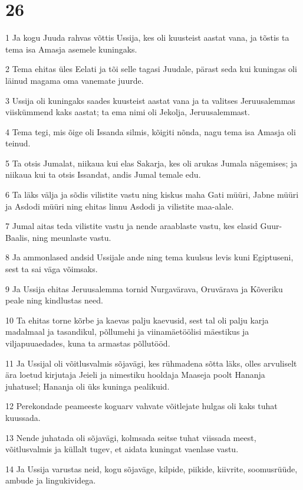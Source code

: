 \chapter{26}

\par 1 Ja kogu Juuda rahvas võttis Ussija, kes oli kuusteist aastat vana, ja tõstis ta tema isa Amasja asemele kuningaks.
\par 2 Tema ehitas üles Eelati ja tõi selle tagasi Juudale, pärast seda kui kuningas oli läinud magama oma vanemate juurde.
\par 3 Ussija oli kuningaks saades kuusteist aastat vana ja ta valitses Jeruusalemmas viiskümmend kaks aastat; ta ema nimi oli Jekolja, Jeruusalemmast.
\par 4 Tema tegi, mis õige oli Issanda silmis, kõigiti nõnda, nagu tema isa Amasja oli teinud.
\par 5 Ta otsis Jumalat, niikaua kui elas Sakarja, kes oli arukas Jumala nägemises; ja niikaua kui ta otsis Issandat, andis Jumal temale edu.
\par 6 Ta läks välja ja sõdis vilistite vastu ning kiskus maha Gati müüri, Jabne müüri ja Asdodi müüri ning ehitas linnu Asdodi ja vilistite maa-alale.
\par 7 Jumal aitas teda vilistite vastu ja nende araablaste vastu, kes elasid Guur-Baalis, ning meunlaste vastu.
\par 8 Ja ammonlased andsid Ussijale ande ning tema kuulsus levis kuni Egiptuseni, sest ta sai väga võimsaks.
\par 9 Ja Ussija ehitas Jeruusalemma tornid Nurgavärava, Oruvärava ja Kõveriku peale ning kindlustas need.
\par 10 Ta ehitas torne kõrbe ja kaevas palju kaevusid, sest tal oli palju karja madalmaal ja tasandikul, põllumehi ja viinamäetöölisi mäestikus ja viljapuuaedades, kuna ta armastas põllutööd.
\par 11 Ja Ussijal oli võitlusvalmis sõjavägi, kes rühmadena sõtta läks, olles arvuliselt ära loetud kirjutaja Jeieli ja nimestiku hooldaja Maaseja poolt Hananja juhatusel; Hananja oli üks kuninga pealikuid.
\par 12 Perekondade peameeste koguarv vahvate võitlejate hulgas oli kaks tuhat kuussada.
\par 13 Nende juhatada oli sõjavägi, kolmsada seitse tuhat viissada meest, võitlusvalmis ja küllalt tugev, et aidata kuningat vaenlase vastu.
\par 14 Ja Ussija varustas neid, kogu sõjaväge, kilpide, piikide, kiivrite, soomusrüüde, ambude ja lingukividega.
